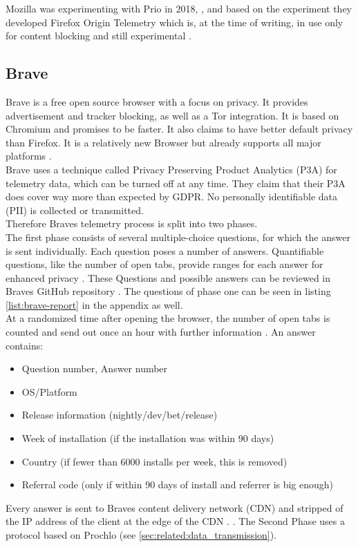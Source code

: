         
        
    
        Mozilla was experimenting with Prio in 2018, \cite{helmer_testing_2018}, and based on the experiment they developed Firefox Origin Telemetry  \cite{englehardt_next_2019} which is, at the time of writing, in use only for content blocking and still experimental \cite{noauthor_origin_nodate}.\\
    
    
    \subsection{Brave}
        Brave is a free open source browser with a focus on privacy. It provides advertisement and tracker blocking, as well as a Tor integration. It is based on Chromium and promises to be faster. It also claims to have better default privacy than Firefox. It is a relatively new Browser but already supports all major platforms \cite{brave_secure_nodate}.\\
        Brave uses a technique called Privacy Preserving Product Analytics (P3A) for telemetry data, which can be turned off at any time.
        They claim that their P3A does cover way more than expected by GDPR. No personally identifiable data (PII) is collected or transmitted.\\
        Therefore Braves telemetry process is split into two phases.\\
        The first phase consists of several multiple-choice questions, for which the answer is sent individually.
        Each question poses a number of answers. Quantifiable questions, like the number of open tabs, provide ranges for each answer for enhanced privacy \cite{brave_privacy-preserving_2019}. These Questions and possible answers can be reviewed in Braves GitHub repository \cite{brave_software_inc_brave-browser_2019}.
        The questions of phase one can be seen in listing \ref{list:brave-report} in the appendix as well.\\
        At a randomized time after opening the browser, the number of open tabs is counted and send out once an hour with further information \cite{brave_privacy-preserving_2019}.
        An answer contains:
        \begin{itemize}
            \item Question number, Answer number
            \item OS/Platform
            \item Release information (nightly/dev/bet/release)
            \item Week of installation (if the installation was within 90 days)
            \item Country (if fewer than 6000 installs per week, this is removed)
            \item Referral code (only if within 90 days of install and referrer is big enough)
        \end{itemize}
        Every answer is sent to Braves content delivery network (CDN) and stripped of the IP address of the client at the edge of the CDN \cite{brave_privacy-preserving_2019}.
        . 
        The Second Phase uses a protocol based on Prochlo (see \ref{sec:related:data_transmission}). 
        
